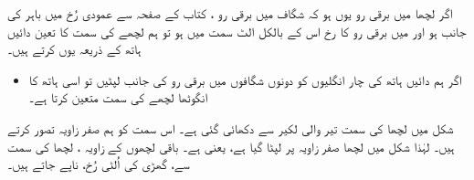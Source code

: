  اگر  لچھا  میں برقی رو یوں ہو کہ شگاف  میں برقی رو ، کتاب کے صفحہ سے عمودی رُخ میں باہر کی جانب ہو اور   میں برقی رو کا رخ اس کے بالکل الٹ سمت میں ہو تو ہم لچھے کی سمت کا تعین دائیں ہاتھ کے ذریعہ یوں کرتے ہیں۔

\begin{itemize}
\item
اگر ہم دائیں ہاتھ کی چار انگلیوں کو دونوں شگافوں میں برقی رو کی جانب لپٹیں تو اسی ہاتھ کا انگوٹھا لچھے کی سمت متعین کرتا ہے۔
\end{itemize}

 شکل   میں لچھا  کی سمت تیر والی لکیر سے دکھائی گئی ہے۔ اس سمت کو ہم صفر زاویہ تصور کرتے ہیں۔ لہٰذا شکل میں  لچھا صفر زاویہ پر لپٹا گیا ہے، یعنی  ہے۔ باقی لچھوں کے زاویہ ، لچھا  کی سمت سے، گھڑی کی اُلٹی رُخ، ناپے جاتے ہیں۔

